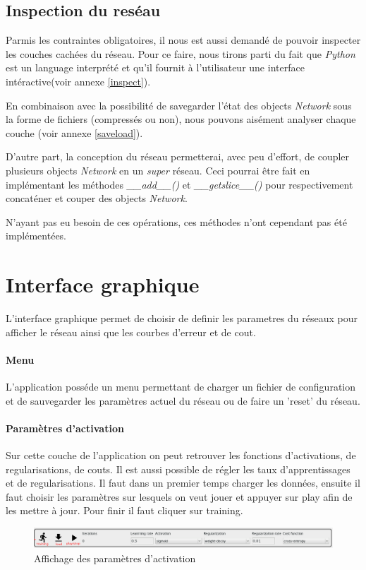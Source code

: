 \documentclass[11pt]{article}
\begin{document}
\subsection{Inspection du res\'eau}
Parmis les contraintes obligatoires, il nous est aussi demand\'e de pouvoir
inspecter les couches cach\'ees du r\'eseau. Pour ce faire, nous tirons parti du
fait que {\em Python} est un language interpr\'et\'e et qu'il fournit \`a
l'utilisateur une interface int\'eractive(voir annexe \ref{inspect}).

En combinaison avec la possibilit\'e de savegarder l'\'etat des
objects {\em Network} sous la forme de fichiers (compress\'es ou non), nous
pouvons ais\'ement analyser chaque couche (voir annexe \ref{saveload}).

D'autre part, la conception du r\'eseau permetterai, avec peu d'effort, de coupler
plusieurs objects {\em Network} en un {\em super} r\'eseau.
Ceci pourrai \^etre fait en impl\'ementant les m\'ethodes {\em \_\_add\_\_()}
et {\em \_\_getslice\_\_()} pour respectivement concat\'ener et couper des objects
{\em Network}.

N'ayant pas eu besoin de ces op\'erations, ces m\'ethodes n'ont
cependant pas \'et\'e impl\'ement\'ees.

\newpage
\section{Interface graphique}

L'interface graphique permet de choisir de definir les parametres du r\'eseaux
pour afficher le r\'eseau ainsi que les courbes d'erreur et de cout.
\paragraph{Menu} L'application poss\'ede un menu permettant de charger un
fichier de configuration et de sauvegarder les param\`etres actuel du r\'eseau
ou de faire un 'reset' du r\'eseau.

\paragraph{Param\`etres d'activation} Sur cette couche de l'application on
peut retrouver les fonctions d'activations, de regularisations, de couts.
Il est aussi possible de r\'egler les taux d'apprentissages et de
regularisations. Il faut dans un premier temps charger les donn\'ees, ensuite il faut choisir
les param\`etres sur lesquels on veut jouer et appuyer sur play afin de les
mettre \`a jour. Pour finir il faut cliquer sur training.
\begin{figure}[htp]
	\centering
	\includegraphics[scale=.4]{img/parametersLayer.png}
	\caption{Affichage des param\`etres d'activation}
\end{figure}
\end{document}
